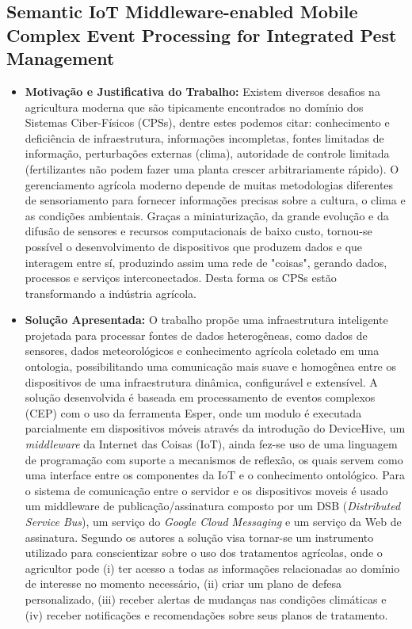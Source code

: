 \documentclass[tid,table]{texufpel} %
\begin{document}
\subsection{Semantic IoT Middleware-enabled Mobile Complex Event Processing for Integrated Pest Management}

\begin{itemize}
	\item \textbf{Motivação e Justificativa do Trabalho:} Existem diversos desafios na agricultura moderna que são tipicamente encontrados no domínio dos Sistemas Ciber-Físicos (CPSs), dentre estes podemos citar: conhecimento e deficiência de infraestrutura, informações incompletas, fontes limitadas de informação, perturbações externas (clima), autoridade de controle limitada (fertilizantes não podem fazer uma planta crescer arbitrariamente rápido). O gerenciamento agrícola moderno depende  de muitas metodologias diferentes de sensoriamento para fornecer informações precisas sobre a cultura, o clima e as condições ambientais. Graças a miniaturização, da grande evolução e da difusão de sensores e recursos computacionais de baixo custo, tornou-se possível o desenvolvimento de dispositivos que produzem dados e que interagem entre sí, produzindo assim uma rede de "coisas", gerando dados, processos e serviços interconectados. Desta forma os CPSs estão transformando a indústria agrícola.
	
	\item \textbf{Solução Apresentada:} O trabalho propõe uma infraestrutura inteligente projetada para processar fontes de dados heterogêneas, como dados de sensores, dados meteorológicos e conhecimento agrícola coletado em uma ontologia, possibilitando uma comunicação mais suave e homogênea entre os dispositivos de uma infraestrutura dinâmica, configurável e extensível. A solução desenvolvida é baseada em processamento de eventos complexos (CEP) com o uso da ferramenta Esper, onde um modulo é executada parcialmente em dispositivos móveis através da introdução do DeviceHive, um \textit{middleware} da Internet das Coisas (IoT), ainda fez-se uso de uma linguagem de programação com suporte a mecanismos de reflexão, os quais servem como uma interface entre os componentes da IoT e o conhecimento ontológico. Para o sistema de comunicação entre o servidor e os dispositivos moveis é usado um middleware de publicação/assinatura composto por um DSB (\textit{Distributed Service Bus}), um serviço do \textit{Google Cloud Messaging} e um serviço da Web de assinatura. Segundo os autores a solução visa tornar-se um instrumento utilizado para conscientizar sobre o uso dos tratamentos agrícolas, onde o agricultor pode (i) ter acesso a todas as informações relacionadas ao domínio de interesse no momento necessário, (ii) criar um plano de defesa personalizado, (iii) receber alertas de mudanças nas condições climáticas e (iv) receber notificações e recomendações sobre seus planos de tratamento.


\end{itemize}
\end{document}
